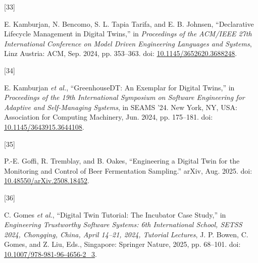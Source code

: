 \documentclass[
  12pt,
  a4paper,
]{article}
\newlength{\cslhangindent}
\newlength{\csllabelwidth}
\newenvironment{CSLReferences}[2] %
 {\begin{list}{}{%
  \setlength{\itemindent}{0pt}
  \setlength{\leftmargin}{0pt}
  \setlength{\parsep}{0pt}
  \ifodd #1
   \setlength{\leftmargin}{\cslhangindent}
   \setlength{\itemindent}{-1\cslhangindent}
  \fi
  \setlength{\itemsep}{#2\baselineskip}}}
 {\end{list}}
\newcommand{\CSLLeftMargin}[1]{\parbox[t]{\csllabelwidth}{\strut#1\strut}}
\newcommand{\CSLRightInline}[1]{\parbox[t]{\linewidth - \csllabelwidth}{\strut#1\strut}}
\begin{document}
\begin{CSLReferences}{0}{0}
\CSLLeftMargin{{[}33{]} }%
\CSLRightInline{E. Kamburjan, N. Bencomo, S. L. Tapia Tarifa, and E. B.
Johnsen, {``Declarative {Lifecycle} {Management} in {Digital}
{Twins},''} in \emph{Proceedings of the {ACM}/{IEEE} 27th
{International} {Conference} on {Model} {Driven} {Engineering}
{Languages} and {Systems}}, Linz Austria: ACM, Sep. 2024, pp. 353--363.
doi:
\href{https://doi.org/10.1145/3652620.3688248}{10.1145/3652620.3688248}.}

\CSLLeftMargin{{[}34{]} }%
\CSLRightInline{E. Kamburjan \emph{et al.}, {``{GreenhouseDT}: {An}
{Exemplar} for {Digital} {Twins},''} in \emph{Proceedings of the 19th
{International} {Symposium} on {Software} {Engineering} for {Adaptive}
and {Self}-{Managing} {Systems}}, in {SEAMS} '24. New York, NY, USA:
Association for Computing Machinery, Jun. 2024, pp. 175--181. doi:
\href{https://doi.org/10.1145/3643915.3644108}{10.1145/3643915.3644108}.}

\CSLLeftMargin{{[}35{]} }%
\CSLRightInline{P.-E. Goffi, R. Tremblay, and B. Oakes, {``Engineering a
{Digital} {Twin} for the {Monitoring} and {Control} of {Beer}
{Fermentation} {Sampling}.''} arXiv, Aug. 2025. doi:
\href{https://doi.org/10.48550/arXiv.2508.18452}{10.48550/arXiv.2508.18452}.}

\CSLLeftMargin{{[}36{]} }%
\CSLRightInline{C. Gomes \emph{et al.}, {``Digital {Twin} {Tutorial}:
{The} {Incubator} {Case} {Study},''} in \emph{Engineering {Trustworthy}
{Software} {Systems}: 6th {International} {School}, {SETSS} 2024,
{Chongqing}, {China}, {April} 14--21, 2024, {Tutorial} {Lectures}}, J.
P. Bowen, C. Gomes, and Z. Liu, Eds., Singapore: Springer Nature, 2025,
pp. 68--101. doi:
\href{https://doi.org/10.1007/978-981-96-4656-2_3}{10.1007/978-981-96-4656-2\_3}.}

\end{CSLReferences}
\end{document}
